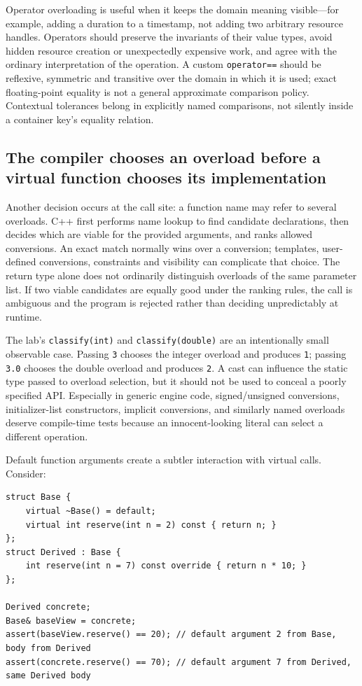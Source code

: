 Operator overloading is useful when it keeps the domain meaning visible---for example, adding a duration to a timestamp, not adding two arbitrary resource handles. Operators should preserve the invariants of their value types, avoid hidden resource creation or unexpectedly expensive work, and agree with the ordinary interpretation of the operation. A custom \texttt{operator==} should be reflexive, symmetric and transitive over the domain in which it is used; exact floating-point equality is not a general approximate comparison policy. Contextual tolerances belong in explicitly named comparisons, not silently inside a container key's equality relation.

\subsection{The compiler chooses an overload before a virtual function chooses its implementation}\label{01-foundations-i-ch004-the-compiler-chooses-an-overload-before-a-virtual-function-chooses-its-implementation}

Another decision occurs at the call site: a function name may refer to several overloads. C++ first performs name lookup to find candidate declarations, then decides which are viable for the provided arguments, and ranks allowed conversions. An exact match normally wins over a conversion; templates, user-defined conversions, constraints and visibility can complicate that choice. The return type alone does not ordinarily distinguish overloads of the same parameter list. If two viable candidates are equally good under the ranking rules, the call is ambiguous and the program is rejected rather than deciding unpredictably at runtime.

The lab's \texttt{classify(int)} and \texttt{classify(double)} are an intentionally small observable case. Passing \texttt{3} chooses the integer overload and produces \texttt{1}; passing \texttt{3.0} chooses the double overload and produces \texttt{2}. A cast can influence the static type passed to overload selection, but it should not be used to conceal a poorly specified API. Especially in generic engine code, signed/unsigned conversions, initializer-list constructors, implicit conversions, and similarly named overloads deserve compile-time tests because an innocent-looking literal can select a different operation.

Default function arguments create a subtler interaction with virtual calls. Consider:

\begin{verbatim}
struct Base {
    virtual ~Base() = default;
    virtual int reserve(int n = 2) const { return n; }
};
struct Derived : Base {
    int reserve(int n = 7) const override { return n * 10; }
};

Derived concrete;
Base& baseView = concrete;
assert(baseView.reserve() == 20); // default argument 2 from Base, body from Derived
assert(concrete.reserve() == 70); // default argument 7 from Derived, same Derived body
\end{verbatim}

